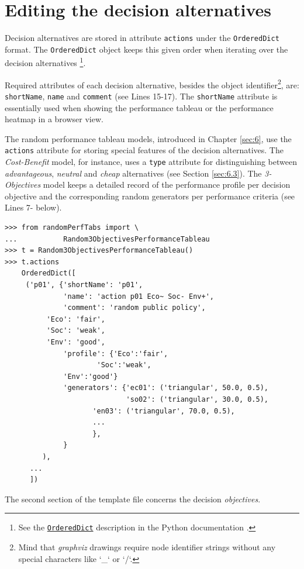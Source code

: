 \section{Editing the decision alternatives}
\label{sec:5.2}

Decision alternatives are stored in attribute \texttt{actions} under the \texttt{OrderedDict} format. The \texttt{OrderedDict} object keeps this given order when iterating over the decision alternatives \footnote{See the \href{https://docs.python.org/3/library/collections.html}{{\tt OrderedDict}} description in the Python documentation \citep{python}.}.

Required attributes of each decision alternative, besides the object identifier\footnote{Mind that \emph{graphviz} drawings require node identifier strings without any special characters like `\_` or `/`.},  are: \texttt{shortName}, \texttt{name} and \texttt{comment} (see Lines 15-17). The \texttt{shortName} attribute is essentially used when showing the performance tableau or the performance heatmap in a browser view.

The random performance tableau models, introduced in Chapter \ref{sec:6}, use the \texttt{actions} attribute for storing special features of the decision alternatives. The \emph{Cost-Benefit} model, for instance, uses a \texttt{type} attribute for distinguishing between \emph{advantageous}, \emph{neutral} and \emph{cheap} alternatives (see Section \ref{sec:6.3}). The \emph{3-Objectives} model keeps a detailed record of the performance profile per decision objective and the corresponding random generators per performance criteria (see Lines 7- below).
\begin{lstlisting}
>>> from randomPerfTabs import \
...           Random3ObjectivesPerformanceTableau
>>> t = Random3ObjectivesPerformanceTableau()
>>> t.actions
    OrderedDict([
     ('p01', {'shortName': 'p01',
              'name': 'action p01 Eco~ Soc- Env+',
              'comment': 'random public policy',
	      'Eco': 'fair',
	      'Soc': 'weak',
	      'Env': 'good',
              'profile': {'Eco':'fair',
	                  'Soc':'weak',
			  'Env':'good'}
              'generators': {'ec01': ('triangular', 50.0, 0.5),
                             'so02': ('triangular', 30.0, 0.5),
		             'en03': ('triangular', 70.0, 0.5),
		             ...
		             },
              }
         ),
      ...
      ])
\end{lstlisting}

The second section of the template file concerns the decision \emph{objectives}.

